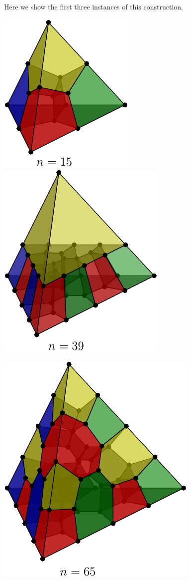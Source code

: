 \documentclass[12pt]{article}
\begin{document}
Here we show the first three instances of this construction.
\begin{center}
\includegraphics{pic-gcolor-1.pdf}
\includegraphics{pic-gcolor-15.pdf}
\end{center}

\begin{center}
\includegraphics{pic-gcolor-2.pdf}
\end{center}
\end{document}
